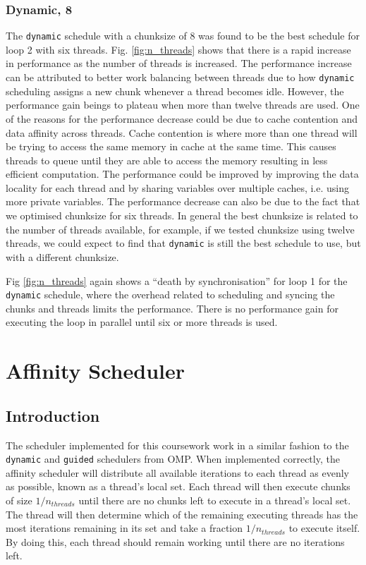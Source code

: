\documentclass[11pt, a4paper]{article}
\begin{document}
			\subsubsection{Dynamic, 8}
				The \texttt{dynamic} schedule with a chunksize of 8 was found to be the best schedule for loop 2 with six threads. Fig. \ref{fig:n_threads} shows that there is a rapid increase in performance as the number of threads is increased. The performance increase can be attributed to better work balancing between threads due to how \texttt{dynamic} scheduling assigns a new chunk whenever a thread becomes idle. However, the performance gain beings to plateau when more than twelve threads are used. One of the reasons for the performance decrease could be due to cache contention and data affinity across threads. Cache contention is where more than one thread will be trying to access the same memory in cache at the same time. This causes threads to queue until they are able to access the memory resulting in less efficient computation. The performance could be improved by improving the data locality for each thread and by sharing variables over multiple caches, i.e. using more private variables. The performance decrease can also be due to the fact that we optimised chunksize for six threads. In general the best chunksize is related to the number of threads available, for example, if we tested chunksize using twelve threads, we could expect to find that \texttt{dynamic} is still the best schedule to use, but with a different chunksize.
				
				Fig \ref{fig:n_threads} again shows a ``death by synchronisation'' for loop 1 for the \texttt{dynamic} schedule, where the overhead related to scheduling and syncing the chunks and threads limits the performance. There is no performance gain for executing the loop in parallel until six or more threads is used. 
			
	\section{Affinity Scheduler}
		\subsection{Introduction} \label{sect:affinity_intro}
			The scheduler implemented for this coursework work in a similar fashion to the \texttt{dynamic} and \texttt{guided} schedulers from OMP. When implemented correctly, the affinity scheduler will distribute all available iterations to each thread as evenly as possible, known as a thread's local set. Each thread will then execute chunks of size $1/n_{threads}$ until there are no chunks left to execute in a thread's local set. The thread will then determine which of the remaining executing threads has the most iterations remaining in its set and take a fraction $1/n_{threads}$ to execute itself. By doing this, each thread should remain working until there are no iterations left.
			
\end{document}
